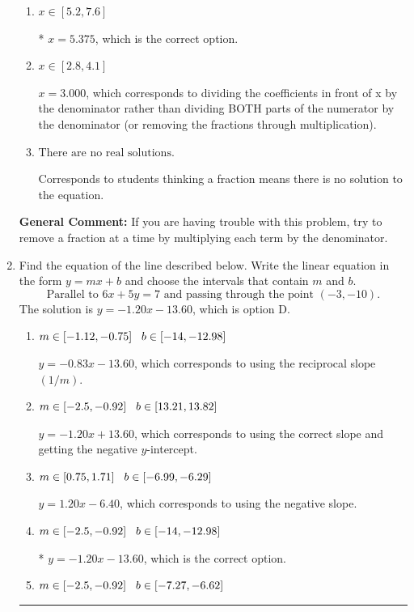 \documentclass{extbook}[14pt]
\newcommand{\litem}[1]{\item #1

\rule{\textwidth}{0.4pt}}
\begin{document}
\begin{enumerate}
{\begin{enumerate}[label=\Alph*.]
 $x = -4.625$, which corresponds to not distributing the negative in front of the second fraction.
\item \( x \in [5.2, 7.6] \)

* $x = 5.375$, which is the correct option.
\item \( x \in [2.8, 4.1] \)

 $x = 3.000$, which corresponds to dividing the coefficients in front of x by the denominator rather than dividing BOTH parts of the numerator by the denominator (or removing the fractions through multiplication).
\item \( \text{There are no real solutions.} \)

Corresponds to students thinking a fraction means there is no solution to the equation.
\end{enumerate}

\textbf{General Comment:} If you are having trouble with this problem, try to remove a fraction at a time by multiplying each term by the denominator.
}
\litem{
Find the equation of the line described below. Write the linear equation in the form $ y=mx+b $ and choose the intervals that contain $m$ and $b$.
\[ \text{Parallel to } 6 x + 5 y = 7 \text{ and passing through the point } (-3, -10). \]The solution is \( y = -1.20x - 13.60 \), which is option D.\begin{enumerate}[label=\Alph*.]
\item \( m \in [-1.12, -0.75] \hspace*{3mm} b \in [-14, -12.98] \)

 $y = -0.83x - 13.60$, which corresponds to using the reciprocal slope $(1/m)$.
\item \( m \in [-2.5, -0.92] \hspace*{3mm} b \in [13.21, 13.82] \)

 $y = -1.20x + 13.60$, which corresponds to using the correct slope and getting the negative $y$-intercept.
\item \( m \in [0.75, 1.71] \hspace*{3mm} b \in [-6.99, -6.29] \)

 $y = 1.20x - 6.40$, which corresponds to using the negative slope.
\item \( m \in [-2.5, -0.92] \hspace*{3mm} b \in [-14, -12.98] \)

* $y = -1.20x - 13.60$, which is the correct option.
\item \( m \in [-2.5, -0.92] \hspace*{3mm} b \in [-7.27, -6.62] \)


\end{enumerate}}
\end{enumerate}
\end{document}
